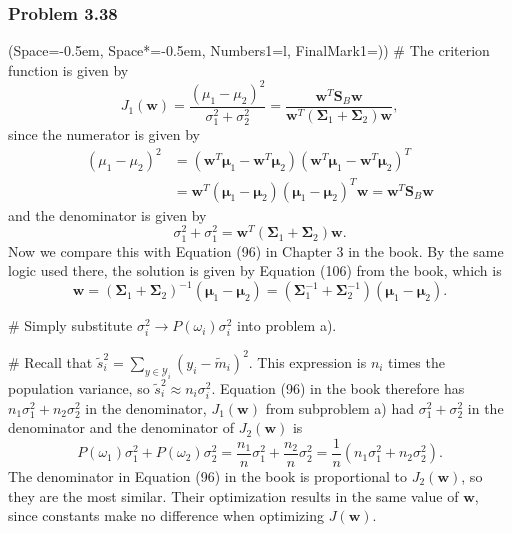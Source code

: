 \documentclass[12pt, a4paper]{article}
\newcommand{\listSpace}{-0.5em}%
\newcommand{\vect}[1]{\bm{#1}}
\begin{document}
\subsubsection*{Problem 3.38}
\begin{easylist}[enumerate]
\ListProperties(Space=\listSpace, Space*=\listSpace, Numbers1=l, FinalMark1={)})
# The criterion function is given by
\begin{equation*}
	J_1 (\vect{w}) = \frac{\left( \mu_1 - \mu_2 \right)^2}{\sigma_1^2 + \sigma_2^2} = \frac{\vect{w}^T \vect{S}_B \vect{w}}
	{\vect{w}^T \left( \vect{\Sigma}_1 + \vect{\Sigma}_2 \right)
		\vect{w}},
\end{equation*}
since the numerator is given by
\begin{align*}
	\left( \mu_1 - \mu_2 \right)^2 &= 
	\left( \vect{w}^T \vect{\mu}_1 - \vect{w}^T \vect{\mu}_2 \right)
	\left( \vect{w}^T \vect{\mu}_1 - \vect{w}^T \vect{\mu}_2 \right)^T \\
	&=
	\vect{w}^T 
	\left(  \vect{\mu}_1 -  \vect{\mu}_2 \right)
	\left(  \vect{\mu}_1 -  \vect{\mu}_2 \right)^T
	 \vect{w}
	 =
	 \vect{w}^T 
	\vect{S}_B
	 \vect{w}
\end{align*}
and the denominator is given by
\begin{equation*}
	\sigma_1^2 + \sigma_1^2 = \vect{w}^T 
	\left( \vect{\Sigma}_1 + \vect{\Sigma}_2 \right)
	\vect{w}.
\end{equation*}
Now we compare this with Equation (96) in Chapter 3 in the book.
By the same logic used there, the solution is given by Equation (106) from the book, which is
\begin{equation*}
	\vect{w} = \left(\vect{\Sigma}_1 + \vect{\Sigma}_2 \right)^{-1} \left(  \vect{\mu}_1 -  \vect{\mu}_2 \right)
	=
	\left(\vect{\Sigma}_1^{-1} + \vect{\Sigma}_2^{-1} \right) \left(  \vect{\mu}_1 -  \vect{\mu}_2 \right).
\end{equation*}

# Simply substitute $\sigma_i^2 \to P(\omega_i) \sigma_i^2$ into problem a).

# Recall that $\tilde{s}_i^2 = \sum_{y \in \mathcal{Y}_i} (y_i - \tilde{m}_i)^2$. 
This expression is $n_i$ times the population variance, so $\tilde{s}_i^2 \approx n_i \sigma_i^2$.
Equation (96) in the book therefore has $n_1 \sigma_1^2 + n_2 \sigma_2^2$ in the denominator, $J_1 (\vect{w})$ from subproblem a) had $ \sigma_1^2 +  \sigma_2^2$ in the denominator and the denominator of $J_2 (\vect{w})$ is
\begin{equation*}
	P(\omega_1) \sigma_1^2 + P(\omega_2) \sigma_2^2 = 
	\frac{n_1}{n} \sigma_1^2 + \frac{n_2}{n} \sigma_2^2
	= \frac{1}{n} \left( n_1 \sigma_1^2 + n_2 \sigma_2^2 \right).
\end{equation*}
The denominator in Equation (96) in the book is proportional to $J_2 (\vect{w})$, so they are the most similar.
Their optimization results in the same value of $\vect{w}$, since constants make no difference when optimizing $J(\vect{w})$.
\end{easylist}
\end{document}
